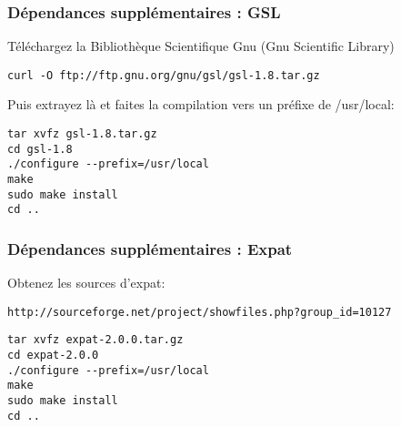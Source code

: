 \subsubsection{Dépendances supplémentaires : GSL}
Téléchargez la Bibliothèque Scientifique Gnu (Gnu Scientific Library)

\begin{verbatim}
curl -O ftp://ftp.gnu.org/gnu/gsl/gsl-1.8.tar.gz 
\end{verbatim}

Puis extrayez là et faites la compilation vers un préfixe de /usr/local:

\begin{verbatim}
tar xvfz gsl-1.8.tar.gz 
cd gsl-1.8 
./configure --prefix=/usr/local 
make
sudo make install
cd ..  
\end{verbatim}

% 
% 

\subsubsection{Dépendances supplémentaires : Expat}
Obtenez les sources d'expat:

\begin{verbatim}
http://sourceforge.net/project/showfiles.php?group_id=10127 
\end{verbatim}

\begin{verbatim}
tar xvfz expat-2.0.0.tar.gz 
cd expat-2.0.0 
./configure --prefix=/usr/local
make 
sudo make install 
cd ..  
\end{verbatim}

